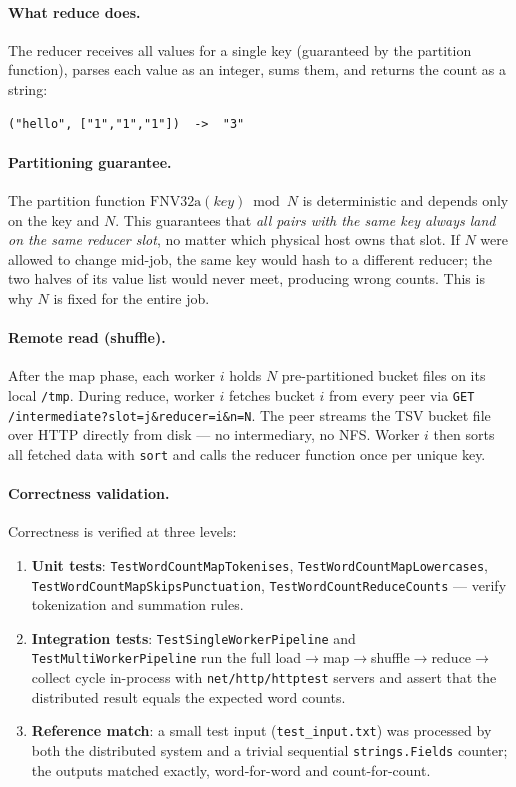 \documentclass[11pt,a4paper]{article}
\begin{document}
\paragraph{What reduce does.}
The reducer receives all values for a single key (guaranteed by the partition
function), parses each value as an integer, sums them, and returns the count as
a string:
\begin{lstlisting}[style=codeblock]
("hello", ["1","1","1"])  ->  "3"
\end{lstlisting}

\paragraph{Partitioning guarantee.}
The partition function \(\mathrm{FNV32a}(key) \bmod N\) is deterministic and
depends only on the key and \(N\). This guarantees that \emph{all pairs with
the same key always land on the same reducer slot}, no matter which physical
host owns that slot. If \(N\) were allowed to change mid-job, the same key
would hash to a different reducer; the two halves of its value list would never
meet, producing wrong counts. This is why \(N\) is fixed for the entire job.

\paragraph{Remote read (shuffle).}
After the map phase, each worker $i$ holds $N$ pre-partitioned bucket files on
its local \texttt{/tmp}. During reduce, worker $i$ fetches bucket $i$ from
every peer via \texttt{GET /intermediate?slot=j\&reducer=i\&n=N}. The peer
streams the TSV bucket file over HTTP directly from disk — no intermediary, no
NFS. Worker $i$ then sorts all fetched data with \texttt{sort} and calls the
reducer function once per unique key.

\paragraph{Correctness validation.}
Correctness is verified at three levels:
\begin{enumerate}[leftmargin=1.5em]
  \item \textbf{Unit tests}: \texttt{TestWordCountMapTokenises},
  \texttt{TestWordCountMapLowercases}, \texttt{TestWordCountMapSkipsPunctuation},
  \texttt{TestWordCountReduceCounts} — verify tokenization and summation rules.
  \item \textbf{Integration tests}: \texttt{TestSingleWorkerPipeline} and
  \texttt{TestMultiWorkerPipeline} run the full load$\to$map$\to$shuffle$\to$reduce$\to$collect
  cycle in-process with \texttt{net/http/httptest} servers and assert that the
  distributed result equals the expected word counts.
  \item \textbf{Reference match}: a small test input (\texttt{test\_input.txt})
  was processed by both the distributed system and a trivial sequential
  \texttt{strings.Fields} counter; the outputs matched exactly, word-for-word
  and count-for-count.
\end{enumerate}
\end{document}
